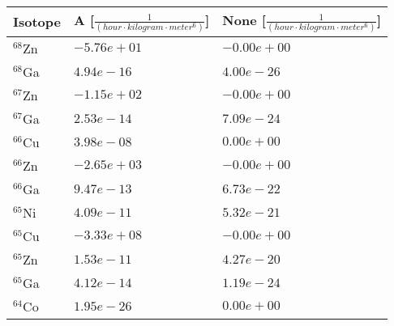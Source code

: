 \begin{tabular}{lll}
\hline
 Isotope   & A [$\frac{1}{\left(hour \cdot kilogram \cdot meter^{6}\right)}$]   & None [$\frac{1}{\left(hour \cdot kilogram \cdot meter^{6}\right)}$]   \\
\hline
 $^{68}$Zn & $-5.76e+01 $                                                       & $-0.00e+00 $                                                          \\
 $^{68}$Ga & $4.94e-16 $                                                        & $4.00e-26 $                                                           \\
 $^{67}$Zn & $-1.15e+02 $                                                       & $-0.00e+00 $                                                          \\
 $^{67}$Ga & $2.53e-14 $                                                        & $7.09e-24 $                                                           \\
 $^{66}$Cu & $3.98e-08 $                                                        & $0.00e+00 $                                                           \\
 $^{66}$Zn & $-2.65e+03 $                                                       & $-0.00e+00 $                                                          \\
 $^{66}$Ga & $9.47e-13 $                                                        & $6.73e-22 $                                                           \\
 $^{65}$Ni & $4.09e-11 $                                                        & $5.32e-21 $                                                           \\
 $^{65}$Cu & $-3.33e+08 $                                                       & $-0.00e+00 $                                                          \\
 $^{65}$Zn & $1.53e-11 $                                                        & $4.27e-20 $                                                           \\
 $^{65}$Ga & $4.12e-14 $                                                        & $1.19e-24 $                                                           \\
 $^{64}$Co & $1.95e-26 $                                                        & $0.00e+00 $                                                           \\

\end{tabular}
